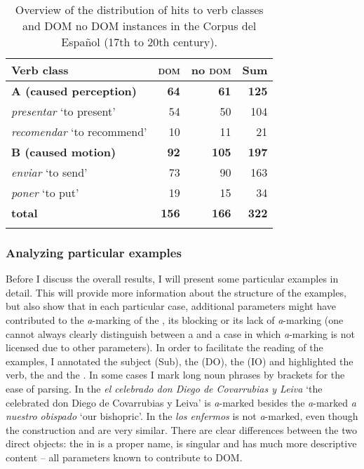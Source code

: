 \documentclass[output=paper]{LSP/langsci}
\begin{document}
\begin{table}
\caption{Overview of the distribution of hits to verb classes and DOM \vs no DOM instances in the Corpus del Español (17th to 20th century).}
\label{11-he-tab:10}
\begin{tabularx}{\textwidth}{Qrrr}
\lsptoprule
Verb class &  \textsc{dom} &  no \textsc{dom} &  Sum\\
\midrule
\textbf{A (caused perception)} &  \textbf{64}  &  \textbf{61} &  \textbf{125}\\
\midrule
\textit{presentar} ‘to present’ &  54 &  50 &  104\\
\textit{recomendar} ‘to recommend’ &  10 &  11 &  21\\
    \tablevspace
\textbf{B (caused motion)} &  \textbf{92} &  \textbf{105} &  \textbf{197}\\
\midrule
\textit{enviar} ‘to send’ &  73 &  90 &  163\\
\textit{poner} ‘to put’ &  19 &  15 &  34\\
\midrule
\textbf{total} &  \textbf{156} &  \textbf{166} &  \textbf{322}\\
\lspbottomrule
\end{tabularx}
\end{table}

 
\subsubsection{Analyzing particular examples}\label{11-subsubsec.4-2-2}

Before I discuss the overall results, I will present some particular examples in detail. This will provide more information about the structure of the examples, but also show that in each particular case, additional parameters might have contributed to the \textit{a}-marking of the , its blocking or its lack of \textit{a}-marking (one cannot always clearly distinguish between a  and a case in which \textit{a}-marking is not licensed due to other parameters). In order to facilitate the reading of the examples, I annotated the subject (Sub), the  (DO), the  (IO) and highlighted the verb, the  and the . In some cases I mark long noun phrases by brackets for the ease of parsing. In  the  \textit{el celebrado don Diego de Covarrubias y Leiva} ‘the celebrated don Diego de Covarrubias y Leiva’ is \textit{a}-marked besides the \textit{a}-marked \textit{ a nuestro obispado} ‘our bishopric’. In  the  \textit{los enfermos} is not \textit{a}-marked, even though the construction and  are very similar. There are clear differences between the two direct objects: the  in  is a proper name, is singular and has much more descriptive content – all parameters known to contribute to DOM.
\end{document}
